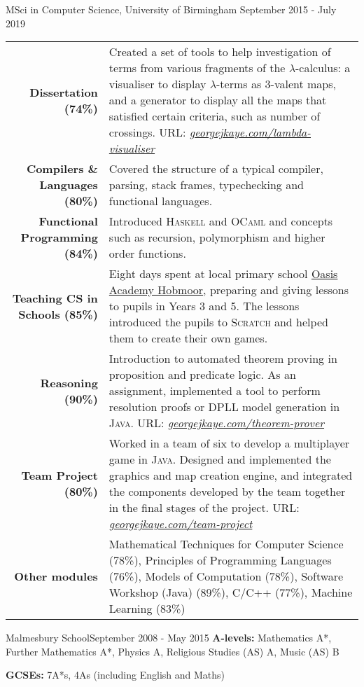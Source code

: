 \begin{education}{%
    MSci in Computer Science, University of Birmingham
}{September 2015 - July 2019}%
    \noindent
    \renewcommand{\arraystretch}{1.55}
    \begin{tabular}{rp{11.5cm}}
        \textbf{Dissertation (74\%)}
        &
        Created a set of tools to help investigation of terms from various
        fragments of the $\lambda$-calculus: a visualiser to display
        $\lambda$-terms as 3-valent maps, and a generator to display all the
        maps that satisfied certain criteria, such as number of crossings. URL:
        \textit{
            \href{https://georgejkaye.com/lambda-visualiser}{georgejkaye.com/lambda-visualiser}}
        \\
        \textbf{Compilers \& Languages (80\%)}
        &
        Covered the structure of a typical compiler, parsing, stack frames,
        typechecking and functional languages.
        \\
        \textbf{Functional Programming (84\%)}
        &
        Introduced \textsc{Haskell} and \textsc{OCaml} and concepts such as
        recursion, polymorphism and higher order functions.
        \\
        \textbf{Teaching CS in Schools (85\%)}
        &
        Eight days spent at local primary school
        {\href{https://www.oasisacademyhobmoor.org/}{Oasis Academy Hobmoor}},
        preparing and giving lessons to pupils in Years 3 and 5. The lessons
        introduced the pupils to \textsc{Scratch} and helped them to create
        their own games.
        \\
        \textbf{Reasoning (90\%)}
        &
        Introduction to automated theorem proving in proposition and predicate
        logic. As an assignment, implemented a tool to perform resolution proofs
        or DPLL model generation in \textsc{Java}.
        URL:
        \textit{\href{https://georgejkaye.com/theorem-prover}{georgejkaye.com/theorem-prover}}
        \\
        \textbf{Team Project (80\%)}
        &
        Worked in a team of six to develop a multiplayer game in \textsc{Java}.
        Designed and implemented the graphics and map creation engine, and
        integrated the components developed by the team together in the final
        stages of the project.
        URL: \textit{\href{https://georgejkaye.com/team-project}{georgejkaye.com/team-project}}                                           \\
        \textbf{Other modules}
        &
        Mathematical Techniques for Computer Science (78\%),
        Principles of Programming Languages (76\%),
        Models of Computation (78\%), Software Workshop (Java) (89\%),
        C/C++ (77\%), Machine Learning (83\%)
    \end{tabular}
\end{education}

\begin{education}{Malmesbury School}{September 2008 - May 2015}%
    \noindent\textbf{A-levels:}
    Mathematics A*, Further Mathematics A*, Physics A, Religious Studies (AS) A,
    Music (AS) B

    \noindent\textbf{GCSEs:}
    7A*s, 4As (including English and Maths)
\end{education}